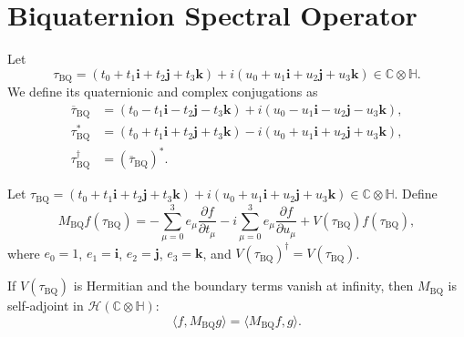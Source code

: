 

\section{Biquaternion Spectral Operator}

\begin{definition}
Let
\begin{equation}
\tau_{\mathrm{BQ}} =
(t_0 + t_1\mathbf{i} + t_2\mathbf{j} + t_3\mathbf{k})
+ i(u_0 + u_1\mathbf{i} + u_2\mathbf{j} + u_3\mathbf{k})
\in \mathbb{C}\otimes\mathbb{H}.
\end{equation}
We define its quaternionic and complex conjugations as
\begin{align}
\overline{\tau}_{\mathrm{BQ}} &=
(t_0 - t_1\mathbf{i} - t_2\mathbf{j} - t_3\mathbf{k})
+ i(u_0 - u_1\mathbf{i} - u_2\mathbf{j} - u_3\mathbf{k}), \\
\tau_{\mathrm{BQ}}^{*} &=
(t_0 + t_1\mathbf{i} + t_2\mathbf{j} + t_3\mathbf{k})
- i(u_0 + u_1\mathbf{i} + u_2\mathbf{j} + u_3\mathbf{k}), \\
\tau_{\mathrm{BQ}}^{\dagger} &= (\overline{\tau}_{\mathrm{BQ}})^{*}.
\end{align}
\end{definition}

\begin{definition}
Let $\tau_{\mathrm{BQ}} = (t_0 + t_1\mathbf{i} + t_2\mathbf{j} + t_3\mathbf{k})
+ i(u_0 + u_1\mathbf{i} + u_2\mathbf{j} + u_3\mathbf{k}) \in \mathbb{C}\otimes\mathbb{H}$.
Define
\begin{equation}
M_{\mathrm{BQ}} f(\tau_{\mathrm{BQ}}) =
-\sum_{\mu=0}^{3} e_\mu \frac{\partial f}{\partial t_\mu}
- i \sum_{\mu=0}^{3} e_\mu \frac{\partial f}{\partial u_\mu}
+ V(\tau_{\mathrm{BQ}}) f(\tau_{\mathrm{BQ}}),
\end{equation}
where $e_0=1$, $e_1=\mathbf{i}$, $e_2=\mathbf{j}$, $e_3=\mathbf{k}$,
and $V(\tau_{\mathrm{BQ}})^\dagger = V(\tau_{\mathrm{BQ}})$.
\end{definition}

\begin{proposition}
If $V(\tau_{\mathrm{BQ}})$ is Hermitian and the boundary terms vanish at infinity,
then $M_{\mathrm{BQ}}$ is self-adjoint in $\mathcal{H}(\mathbb{C}\otimes\mathbb{H})$:
\begin{equation}
\langle f, M_{\mathrm{BQ}} g \rangle = \langle M_{\mathrm{BQ}} f, g \rangle.
\end{equation}
\end{proposition}

